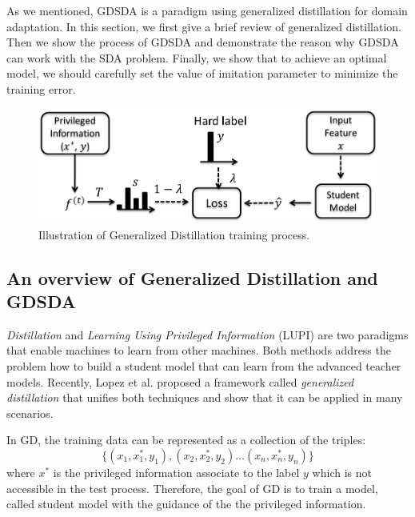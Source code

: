 As we mentioned, GDSDA is a paradigm using generalized distillation for domain adaptation. In this section, we first give a brief review of generalized distillation. Then we show the process of GDSDA and demonstrate the reason why GDSDA can work with the SDA problem. Finally, we show that to achieve an optimal model, we should carefully set the value of imitation parameter to minimize the training error. 
\begin{figure}
\centering
\includegraphics[scale=.4]{figure/GD.png}
\caption{Illustration of Generalized Distillation training process.}
\end{figure}
\subsection{An overview of Generalized Distillation and GDSDA}
\textit{Distillation} \cite{hinton2015distilling} and \textit{Learning Using Privileged Information} (LUPI) \cite{vapnik2015learning} are two paradigms that enable machines to learn from other machines. Both methods address the problem how to build a student model that can learn from the advanced teacher models. Recently, Lopez {et al.} \cite{lopez2015unifying} proposed a framework called \textit{generalized distillation} that unifies both techniques and show that it can be applied in many scenarios.

In GD, the training data can be represented as a collection of the triples:
\[\{\left(x_1,x_1^*,y_1\right),\left(x_2,x_2^*,y_2\right) \dots \left(x_n,x_n^*,y_n\right)\}\]
where $x^*$ is the privileged information associate to the label $y$ which is not accessible in the test process. Therefore, the goal of GD is to train a model, called student model with the guidance of the the privileged information.

